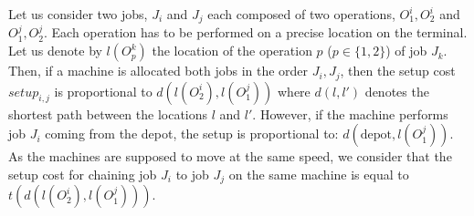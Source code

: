 \documentclass[a4paper,12pt]{article}
\begin{document}
Let us consider two jobs, $J_i$ and $J_j$ each composed of two operations, $O^i_1, O^i_2$ and $O^j_1, O^j_2$. Each operation has to be performed on a precise location on the terminal. Let us denote by $l(O^k_p)$ the location of the operation $p$ ($p \in \{1,2\}$) of job $J_k$. Then, if a machine is allocated both jobs in the order $J_i, J_j$, then the setup cost $setup_{i,j}$ is proportional to $d(l(O^i_2),l(O^j_1))$ where $d(l,l')$ denotes the shortest path between the locations $l$ and $l'$. However, if the machine performs job $J_i$ coming from the depot, the setup is proportional to: $d(\mbox{depot},l(O^j_1))$. As the machines are supposed to move at the same speed, we consider that the setup cost for chaining job $J_i$ to job $J_j$ on the same machine is equal to $t(d(l(O^i_2),l(O^j_1)))$. %
%
 

\end{document}
